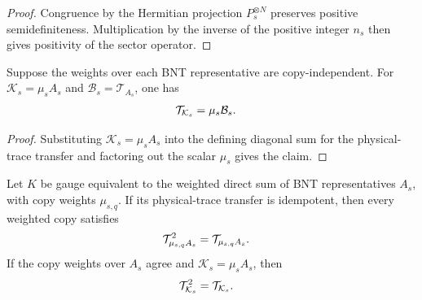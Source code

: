 \begin{proof}\leanok
    Congruence by the Hermitian projection $P_s^{\otimes N}$ preserves
    positive semidefiniteness. Multiplication by the inverse of the positive
    integer $n_s$ then gives positivity of the sector operator.
\end{proof}

\begin{lemma}
    \label{thm:mpdo_absorbed_bnt_sector_phys_trace_transfer}
    \leanok
    Suppose the weights over each BNT representative are copy-independent.
    For $\mathcal K_s=\mu_sA_s$ and
    $\mathcal B_s=\mathcal T_{A_s}$, one has
    \begin{align}
        \mathcal T_{\mathcal K_s} & =\mu_s\mathcal B_s.
        \notag
    \end{align}
\end{lemma}

\begin{proof}\leanok
    Substituting $\mathcal K_s=\mu_sA_s$ into the defining diagonal sum for the
    physical-trace transfer and factoring out the scalar $\mu_s$ gives the
    claim.
\end{proof}

\begin{lemma}
    \label{thm:mpdo_absorbed_bnt_sector_literal_zcl}
    \leanok
    Let $K$ be gauge equivalent to the weighted direct sum of BNT
    representatives $A_s$, with copy weights $\mu_{s,q}$. If its
    physical-trace transfer is idempotent, then every weighted copy
    satisfies
    \begin{align}
        \mathcal T_{\mu_{s,q}A_s}^{2}
         & =\mathcal T_{\mu_{s,q}A_s}.
        \notag
    \end{align}
    If the copy weights over $A_s$ agree and
    $\mathcal K_s=\mu_sA_s$, then
    \begin{align}
        \mathcal T_{\mathcal K_s}^{2}
         & =\mathcal T_{\mathcal K_s}.
        \notag
    \end{align}
\end{lemma}

